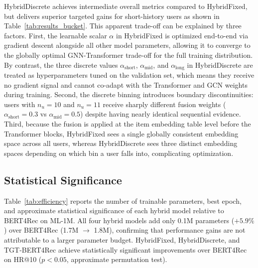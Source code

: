 \documentclass[12pt,a4paper]{report}
\begin{document}
HybridDiscrete achieves intermediate overall metrics compared to HybridFixed,
but delivers superior targeted gains for short-history users as shown in
Table~\ref{tab:results_bucket}. This apparent trade-off can be explained by
three factors. First, the learnable scalar \(\alpha\) in HybridFixed is
optimized end-to-end via gradient descent alongside all other model parameters,
allowing it to converge to the globally optimal GNN-Transformer trade-off for
the full training distribution. By contrast, the three discrete values
\(\alpha_{\text{short}}\), \(\alpha_{\text{mid}}\), and \(\alpha_{\text{long}}\)
in HybridDiscrete are treated as hyperparameters tuned on the validation set,
which means they receive no gradient signal and cannot co-adapt with the
Transformer and GCN weights during training. Second, the discrete binning
introduces boundary discontinuities: users with \(n_u = 10\) and \(n_u = 11\)
receive sharply different fusion weights (\(\alpha_{\text{short}} = 0.3\) vs
\(\alpha_{\text{mid}} = 0.5\)) despite having nearly identical sequential
evidence. Third, because the fusion is applied at the item embedding table
level before the Transformer blocks, HybridFixed sees a single globally
consistent embedding space across all users, whereas HybridDiscrete sees three
distinct embedding spaces depending on which bin a user falls into,
complicating optimization.

\subsection*{Statistical Significance}

Table~\ref{tab:efficiency} reports the number of trainable parameters, best
epoch, and approximate statistical significance of each hybrid model relative
to BERT4Rec on ML-1M. All four hybrid models add only 0.1M parameters
(\(+5.9\%\)) over BERT4Rec (1.7M \(\rightarrow\) 1.8M), confirming that
performance gains are not attributable to a larger parameter budget.
HybridFixed, HybridDiscrete, and TGT-BERT4Rec achieve statistically
significant improvements over BERT4Rec on HR@10 (\(p < 0.05\), approximate
permutation test).
\end{document}
